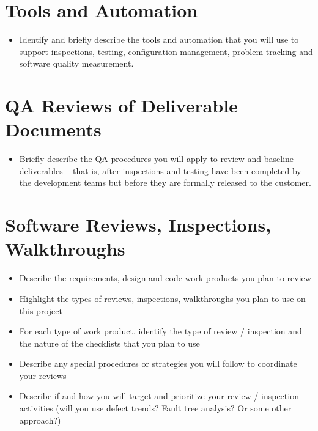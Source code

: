 \documentclass[11pt]{wacomepd} \usepackage{amssymb} \usepackage{enumerate}
\begin{document}
\chapter{Tools and Automation}
\begin{itemize}
\item Identify and briefly describe the tools and automation that you will use to support
  inspections, testing, configuration management, problem tracking and software quality measurement.
\end{itemize}



\chapter{QA Reviews of Deliverable Documents}
\begin{itemize}
\item Briefly describe the QA procedures you will apply to review and baseline deliverables – that
  is, after inspections and testing have been completed by the development teams but before they are
  formally released to the customer.
\end{itemize}



\chapter{Software Reviews, Inspections, Walkthroughs}
\begin{itemize}
\item Describe the requirements, design and code work products you plan to review
\item Highlight the types of reviews, inspections, walkthroughs you plan to use on this project
\item For each type of work product, identify the type of review / inspection and the nature of the
  checklists that you plan to use
\item Describe any special procedures or strategies you will follow to coordinate your reviews
\item Describe if and how you will target and prioritize your review / inspection activities (will
  you use defect trends? Fault tree analysis? Or some other approach?)
\end{itemize}
\end{document}
